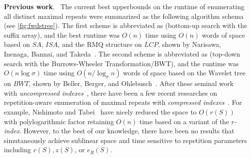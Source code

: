 \textbf{Previous work}.\ 
The current best upperbounds on the runtime of enumerating all distinct  maximal repeats were summarized as the following algorithm schema (see \cref{fig:fwdstree}).
The first scheme is abbreviated as \BUSA{} (bottom-up search with the suffix array),  and the best runtime was $O(n)$ time using $O(n)$ words of space based on $SA$, $ISA$, and the RMQ structure on $LCP$, shown by Narisawa, Inenaga, Bannai, and Takeda~\cite{narisawa2007efficient}. 
The second scheme is abbreviated as \TDBW{} (top-down search with the Burrows-Wheeler Transformation/BWT), and the runtime was $O(n \log\sigma)$ time using $O(n/\log_\sigma n)$ words of space based on the Wavelet tree on $BWT$, shown by Beller, Berger, and Ohlebusch~\cite{beller:berger2012space:efficient:bbo}.
After these seminal work with \textit{uncompressed indexes}~\cite{narisawa2007efficient,beller:berger2012space:efficient:bbo}, there have been a few recent researches on repetition-aware enumeration of maximal repeats with \textit{compressed indexes}~\cite{belazzougui2020linear,nishimoto:cpm2021enum}. For example, Nishimoto and Tabei~\cite{nishimoto:cpm2021enum} have nicely reduced the space to $O(r(S))$ with polylogarithmic factor retaining $O(n)$ time based on a variant of the \textit{$r$-index}. However, to the best of our knowledge, there have been no results that simutaneously achieve sublinear space and time sensitive to repetition parameters including $r(S), z(S)$, or $e_R(S)$. 


